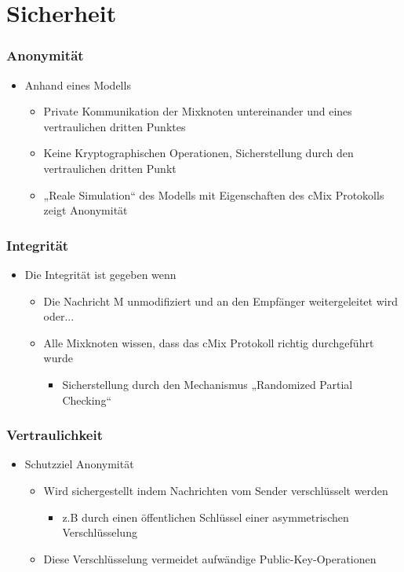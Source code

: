 \documentclass[t, xcolor=dvipsnames]{beamer}
\begin{document}
\section{Sicherheit}

\begin{frame}
	\frametitle{Anonymität}
	\begin{itemize}
		\item Anhand eines Modells
			\begin{itemize}
				\item Private Kommunikation der Mixknoten untereinander und eines vertraulichen dritten Punktes
				\item Keine Kryptographischen Operationen, Sicherstellung durch den vertraulichen dritten Punkt
				\item „Reale Simulation“ des Modells mit Eigenschaften des cMix Protokolls zeigt Anonymität
			\end{itemize}
	\end{itemize}
	\vspace{\fill}
\end{frame}

\begin{frame}
	\frametitle{Integrität}
	\begin{itemize}
		\item Die Integrität ist gegeben wenn
			\begin{itemize}
				\item Die Nachricht M unmodifiziert und an den Empfänger weitergeleitet wird oder...
				\item Alle Mixknoten wissen, dass das cMix Protokoll richtig durchgeführt wurde
					\begin{itemize}
						\item Sicherstellung durch den Mechanismus „Randomized Partial Checking“
					\end{itemize}
			\end{itemize}
	\end{itemize}
	\vspace{\fill}
\end{frame}

\begin{frame}
	\frametitle{Vertraulichkeit}
	\begin{itemize}
		\item Schutzziel Anonymität
			\begin{itemize}
				\item Wird sichergestellt indem Nachrichten vom Sender verschlüsselt werden
					\begin{itemize}
						\item z.B durch einen öffentlichen Schlüssel einer asymmetrischen Verschlüsselung
					\end{itemize}
				\item Diese Verschlüsselung vermeidet aufwändige Public-Key-Operationen 
			\end{itemize}
	\end{itemize}
	\vspace{\fill}
\end{frame}
\end{document}
